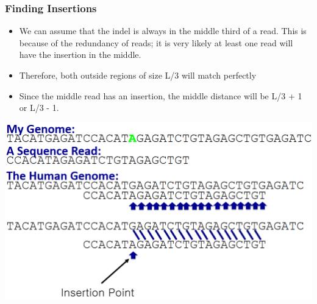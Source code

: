 \documentclass[10pt]{article}
\begin{document}
\subsubsection*{Finding Insertions}
\begin{itemize}
    \item We can assume that the indel is always in the middle third of a read.  This is because of the redundancy of reads; it is very likely at least one read will have the insertion in the middle.
    \item Therefore, both outside regions of size L/3 will match perfectly
    \item Since the middle read has an insertion, the middle distance will be L/3 + 1 or L/3 - 1.
\end{itemize}
\begin{center}
    \includegraphics*[scale=0.4]{W1_6.png}
\end{center}
\end{document}
